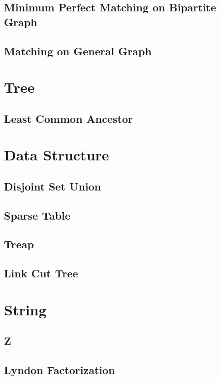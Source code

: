 \documentclass{article}
\begin{document}
\begin{multicols}{2}
    \subsection{Minimum Perfect Matching on Bipartite Graph}
    
    \subsection{Matching on General Graph}
    

    \section{Tree}
    \subsection{Least Common Ancestor}
    

    \section{Data Structure}
    \subsection{Disjoint Set Union}
    
    \subsection{Sparse Table}
    
    \subsection{Treap}
    
    \subsection{Link Cut Tree}
    

    \section{String}
    \subsection{Z}
    
    \subsection{Lyndon Factorization}
    

\end{multicols}
\end{document}
